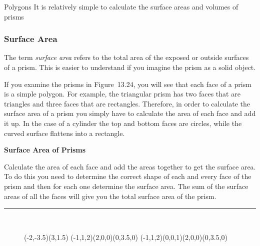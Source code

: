 \begin{exercises}{Polygons}
  \label{m39357*id62698}
  It is relatively simple to calculate the surface areas and volumes of prisms
  \par 
  
\subsubsection{ Surface Area}
  \nopagebreak

  The term \textsl{surface area} refers to the total area of the exposed or outside surfaces of a prism. This is easier to understand if you imagine the prism as a solid object.
  \par 
  If you examine the prisms in Figure~13.24, you will see that each face of a prism is a simple polygon. For example, the triangular prism has two faces that are triangles and three faces that are rectangles. Therefore, in order to calculate the surface area of a prism you simply have to calculate the area of each face and add it up. In the case of a cylinder the top and bottom faces are circles, while the curved surface flattens into a rectangle.
  \par
  \textbf{Surface Area of Prisms}
  \par 
  Calculate the area of each face and add the areas together to get the surface area. To do this you need to determine the correct shape of each and every face of the prism and then for each one determine the surface area. The sum of the surface areas of all the faces will give you the total surface area of the prism.
  \par

\rule[.1in]{\figurerulewidth}{.005in}\\
\begin{figure}[H]
    \begin{center}
	\begin{pspicture}(-2,-3.5)(3,1.5)
	    {
	    \pstThreeDSquare(-1,1,2)(2,0,0)(0,3.5,0)}
	    \pstThreeDBox[hiddenLine](-1,1,2)(0,0,1)(2,0,0)(0,3.5,0)
	\end{pspicture}


\end{center}
\end{figure}
\end{exercises}
